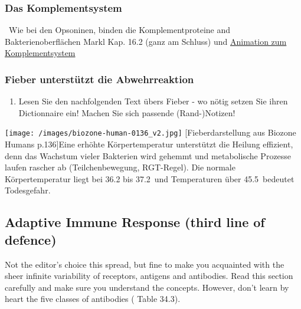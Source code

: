 \subsubsection{Das Komplementsystem}
\Pointinghand\, Wie bei den Opsoninen, binden die Komplementproteine and Bakterienoberflächen   Markl Kap. 16.2 (ganz am Schluss) und \href{https://cloudfs.tam.ch/share/362f92164b2771f7806ebc86e1db186b}{Animation zum Komplementsystem}


\subsubsection{Fieber unterstützt die Abwehrreaktion}

\begin{enumerate}[itemsep=1.5em, leftmargin=*]
\item  Lesen Sie den nachfolgenden Text übers Fieber - wo nötig setzen Sie ihren Dictionnaire ein! Machen Sie sich passende (Rand-)Notizen!
\end{enumerate}

\begin{minipage}{16cm}
	\texttt{[image: /images/biozone-human-0136\_v2.jpg]}
	 [Fieberdarstellung aus Biozone Humans p.136]{Eine erhöhte Körpertemperatur unterstützt die Heilung effizient, denn das Wachstum vieler Bakterien wird gehemmt und metabolische Prozesse laufen rascher ab (Teilchenbewegung, RGT-Regel). Die normale Körpertemperatur liegt bei 36.2 bis 37.2\degreecelsius\, und Temperaturen über 45.5\degreecelsius\, bedeutet Todesgefahr.}
\end{minipage}



\clearpage
\subsection{Adaptive Immune Response (third line of defence)}\label{ssc:AdaptiveImmunity}

		\begin{mdframed}[style=exampledefault, userdefinedwidth=12cm,frametitle={Starr chapter 34.4}\label{mat:BEISPIELMATERIAL}]
			Not the editor's choice this spread, but fine to make you acquainted with the sheer infinite variability of receptors, antigens and antibodies. Read this section carefully and make sure you understand the concepts. However, don't learn by heart the five classes of antibodies ( Table 34.3).
		\end{mdframed}

